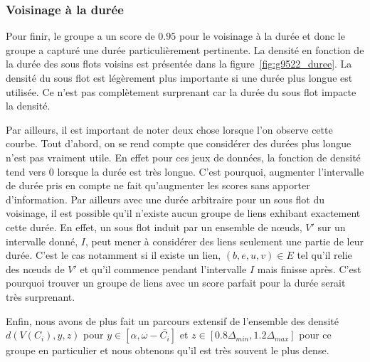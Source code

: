\subsubsection*{Voisinage à la durée}
Pour finir, le groupe a un score de $0.95$ pour le voisinage à la durée et donc le groupe a capturé une durée particulièrement  pertinente.
La densité en fonction de la durée des sous flots voisins est présentée dans la figure~\ref{fig:g9522_duree}.
La densité du sous flot est légèrement plus importante si une durée plus longue est utilisée.
Ce n'est pas complètement surprenant car la durée du sous flot impacte la densité.

Par ailleurs, il est important de noter deux chose lorsque l'on observe cette courbe.
Tout d'abord, on se rend compte que considérer des durées plus longue n'est pas vraiment utile.
En effet pour ces jeux de données, la fonction de densité tend vers $0$ lorsque la durée est très longue.
C'est pourquoi, augmenter l'intervalle de durée pris en compte ne fait qu'augmenter les scores sans apporter d'information.
Par ailleurs avec une durée arbitraire pour un sous flot du voisinage, il est possible qu'il n'existe aucun groupe de liens exhibant exactement cette durée.
En effet, un sous flot induit par un ensemble de n\oe uds, $V'$ sur un intervalle donné, $I$, peut mener à considérer des liens seulement une partie de leur durée.
C'est le cas notamment si il existe un lien, $(b,e,u,v) \in E$ tel qu'il relie des n\oe uds de $V'$ et qu'il commence pendant l'intervalle $I$ mais finisse après.
C'est pourquoi trouver un groupe de liens avec un score parfait pour la durée serait très surprenant.

\bigskip

Enfin, nous avons de plus fait un parcours extensif de l'ensemble des densité $d(V(C_i),y,z)$ pour $y \in [\alpha, \omega - \bar{C_i}]$ et $z \in [0.8\Delta_{min}, 1.2\Delta_{max}]$ pour ce groupe en particulier et nous obtenons qu'il est très souvent le plus dense.

